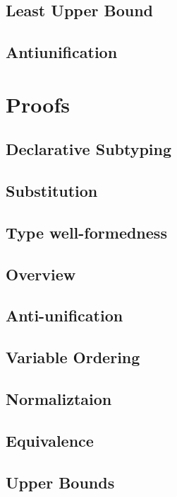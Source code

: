 \documentclass[a4,natbib=false]{article}
\begin{document}
\subsection{Least Upper Bound}
\ottdefnsLUB

\subsection{Antiunification}
\ottdefnsAU

\section{Proofs}

\subsection{Declarative Subtyping}


\subsection{Substitution}


\subsection{Type well-formedness}


\subsection{Overview}


\subsection{Anti-unification}


\subsection{Variable Ordering}


\subsection{Normaliztaion}


\subsection{Equivalence}


\subsection{Upper Bounds}


\end{document}
